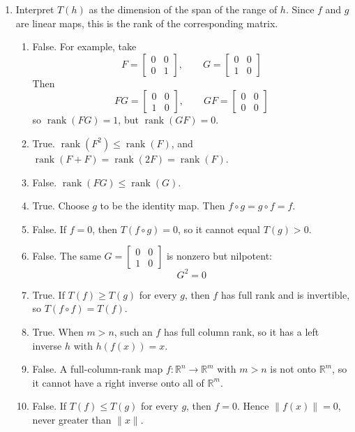 \begin{enumerate}[label=\textbf{\arabic*.}]
    \item Interpret \(T(h)\) as the dimension of the span of the range
    of \(h\). Since \(f\) and \(g\) are linear maps, this is the rank of
    the corresponding matrix.
    \begin{enumerate}[label=(\alph*)]
        \item False. For example, take
        \[
            F=
            \begin{bmatrix}
                0&0\\
                0&1
            \end{bmatrix},
            \qquad
            G=
            \begin{bmatrix}
                0&0\\
                1&0
            \end{bmatrix}
        \]
        Then
        \[
            FG=
            \begin{bmatrix}
                0&0\\
                1&0
            \end{bmatrix},
            \qquad
            GF=
            \begin{bmatrix}
                0&0\\
                0&0
            \end{bmatrix}
        \]
        so \(\operatorname{rank}(FG)=1\), but
        \(\operatorname{rank}(GF)=0\).
        \item True. \(\operatorname{rank}(F^2)\leq\operatorname{rank}(F)\),
        and \(\operatorname{rank}(F+F)=\operatorname{rank}(2F)=\operatorname{rank}(F)\).
        \item False. \(\operatorname{rank}(FG)\leq\operatorname{rank}(G)\).
        \item True. Choose \(g\) to be the identity map. Then
        \(f\circ g=g\circ f=f\).
        \item False. If \(f=0\), then \(T(f\circ g)=0\), so it cannot
        equal \(T(g)>0\).
        \item False. The same
        \(G=\begin{bmatrix}0&0\\1&0\end{bmatrix}\) is nonzero but
        nilpotent:
        \[
            G^2=0
        \]
        \item True. If \(T(f)\geq T(g)\) for every \(g\), then \(f\) has
        full rank and is invertible, so \(T(f\circ f)=T(f)\).
        \item True. When \(m>n\), such an \(f\) has full column rank, so
        it has a left inverse \(h\) with \(h(f(x))=x\).
        \item False. A full-column-rank map \(f:\mathbb{R}^n\to
        \mathbb{R}^m\) with \(m>n\) is not onto \(\mathbb{R}^m\), so it
        cannot have a right inverse onto all of \(\mathbb{R}^m\).
        \item False. If \(T(f)\leq T(g)\) for every \(g\), then \(f=0\).
        Hence \(\|f(x)\|=0\), never greater than \(\|x\|\).
    \end{enumerate}
\end{enumerate}
